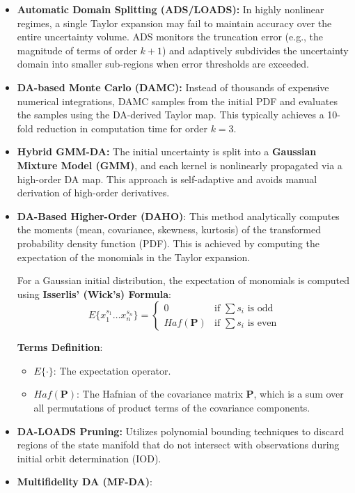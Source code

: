 \documentclass[
  letterpaper,
  DIV=11,
  numbers=noendperiod,
  oneside]{scrartcl}
\begin{document}
\begin{itemize}
\item
  \textbf{Automatic Domain Splitting (ADS/LOADS):} In highly nonlinear
  regimes, a single Taylor expansion may fail to maintain accuracy over
  the entire uncertainty volume. ADS monitors the truncation error
  (e.g., the magnitude of terms of order \(k+1\)) and adaptively
  subdivides the uncertainty domain into smaller sub-regions when error
  thresholds are exceeded.
\item
  \textbf{DA-based Monte Carlo (DAMC):} Instead of thousands of
  expensive numerical integrations, DAMC samples from the initial PDF
  and evaluates the samples using the DA-derived Taylor map. This
  typically achieves a 10-fold reduction in computation time for order
  \(k=3\).
\item
  \textbf{Hybrid GMM-DA:} The initial uncertainty is split into a
  \textbf{Gaussian Mixture Model (GMM)}, and each kernel is nonlinearly
  propagated via a high-order DA map. This approach is self-adaptive and
  avoids manual derivation of high-order derivatives.
\item
  \textbf{DA-Based Higher-Order (DAHO)}: This method analytically
  computes the moments (mean, covariance, skewness, kurtosis) of the
  transformed probability density function (PDF). This is achieved by
  computing the expectation of the monomials in the Taylor expansion.

  For a Gaussian initial distribution, the expectation of monomials is
  computed using \textbf{Isserlis' (Wick's) Formula}: \[
  E\{x_1^{s_1} \dots x_n^{s_n}\} = \begin{cases} 0 & \text{if } \sum s_i \text{ is odd} \\ Haf(\mathbf{P}) & \text{if } \sum s_i \text{ is even} \end{cases}
  \]

  \textbf{Terms Definition}:

  \begin{itemize}
  \item
    \(E\{\cdot\}\): The expectation operator.
  \item
    \(Haf(\mathbf{P})\): The Hafnian of the covariance matrix
    \(\mathbf{P}\), which is a sum over all permutations of product
    terms of the covariance components.
  \end{itemize}
\item
  \textbf{DA-LOADS Pruning:} Utilizes polynomial bounding techniques to
  discard regions of the state manifold that do not intersect with
  observations during initial orbit determination (IOD).
\item
  \textbf{Multifidelity DA (MF-DA)}:


\end{itemize}
\end{document}
